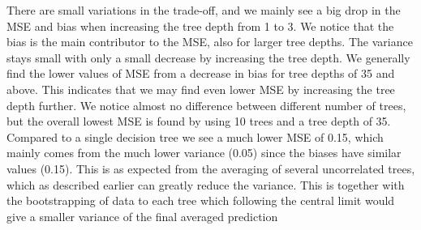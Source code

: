 \documentclass[11pt]{article}
\begin{document}
There are small variations in the trade-off, and we mainly see a big drop in the MSE and bias when increasing the tree depth from 1 to 3. We notice that the bias is the main contributor to the MSE, also for larger tree depths. The variance stays small with only a small decrease by increasing the tree depth. We generally find the lower values of MSE from a decrease in bias for tree depths of 35 and above. This indicates that we may find even lower MSE by increasing the tree depth further. We notice almost no difference between different number of trees, but the overall lowest MSE is found by using 10 trees and a tree depth of 35. Compared to a single decision tree we see a much lower MSE of 0.15, which mainly comes from the much lower variance (0.05) since the biases have similar values (0.15). This is as expected from the averaging of several uncorrelated trees, which as described earlier can greatly reduce the variance. This is together with the bootstrapping of data to each tree which following the central limit would give a smaller variance of the final averaged prediction
\end{document}
